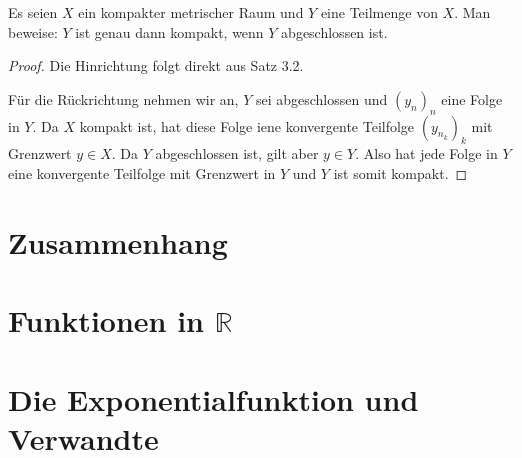 \begin{aufgabe}
	Es seien $X$ ein kompakter metrischer Raum und $Y$ eine Teilmenge von $X$. Man beweise:
	$Y$ ist genau dann kompakt, wenn $Y$ abgeschlossen ist.
\end{aufgabe}
\begin{proof}
	Die Hinrichtung folgt direkt aus Satz 3.2.

	Für die Rückrichtung nehmen wir an, $Y$ sei abgeschlossen und $(y_n)_n$ eine Folge in $Y$.
	Da $X$ kompakt ist, hat diese Folge iene konvergente Teilfolge $(y_{n_k})_k$ mit Grenzwert
	$y \in X$. Da $Y$ abgeschlossen ist, gilt aber $y \in Y$. Also hat jede Folge in $Y$
	eine konvergente Teilfolge mit Grenzwert in $Y$ und $Y$ ist somit kompakt.
\end{proof}


\section{Zusammenhang}
\section{Funktionen in $\mathbb R$}
\section{Die Exponentialfunktion und Verwandte}

